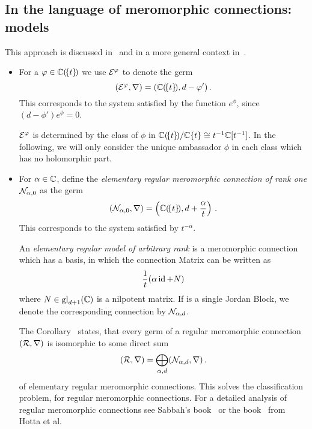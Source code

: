 \subsection{In the language of meromorphic connections: models}
This approach is discussed in~\cite{sabbah_cimpa90} and in a more general
context in~\cite[Sec.II.5]{sabbah2007isomonodromic}.
\begin{defn}\label{defn:elemnMerConnBausteine}
  \begin{itemize}
    \item For a $\varphi\in\mathbb{C}(\!\{t\}\!)$ we use $\mathcal{E}^{\varphi}$ to denote the germ
      \[
        (\mathcal{E}^{\varphi},\nabla)=(\mathbb{C}(\!\{t\}\!),d-\varphi')\,.
      \]
      This corresponds to the system satisfied by the function $e^\phi$, since
      $(d-\phi')e^\phi=0$.
      \begin{s-cor}\label{cor:uniqueAmbassadorForPhi}
        $\mathcal{E}^\varphi$ is determined by the class of $\phi$ in
        $\mathbb{C}(\!\{t\}\!)/\mathbb{C}\{t\}\cong t^{-1}\mathbb{C}[t^{-1}]$. In the following, we
        will only consider the unique ambassador $\phi$ in each class which has
        no holomorphic part.
      \end{s-cor}
    \item For $\alpha\in\mathbb{C}$, define the \emph{elementary regular meromorphic
      connection of rank one} $\mathcal{N}_{\alpha,0}$ as the germ
      \[
        (\mathcal{N}_{\alpha,0},\nabla)=\left(\mathbb{C}(\!\{t\}\!),d+\frac{\alpha}{t}\right)
        \,.
      \]
      This corresponds to the system satisfied by $t^{-\alpha}$.

      An \emph{elementary regular model of arbitrary rank} is a meromorphic
      connection which has a basis, in which the connection Matrix can be
      written as
      \[
        \frac{1}{t} (\alpha\operatorname{id}+N)
      \]
      where $N\in\operatorname{gl}_{d+1}(\mathbb{C})$ is a nilpotent matrix.
      If  is a single Jordan Block, we denote the
      corresponding connection by $\mathcal{N}_{\alpha,d}$.
      \begin{s-rem}
        The Corollary~\cite[Cor.II.2.9]{sabbah2007isomonodromic} states, that
        every germ of a regular meromorphic connection $(\mathcal{R},\nabla)$ is
        isomorphic to some direct sum
        \[
          (\mathcal{R},\nabla)=\bigoplus_{\alpha,d}(\mathcal{N}_{\alpha,d},\nabla)\,.
        \]
        of elementary regular meromorphic connections.
        This solves the classification problem, for regular meromorphic
        connections.
        For a detailed analysis of regular meromorphic connections see Sabbah's
        book~\cite[Sec.II.2]{sabbah2007isomonodromic} or the
        book~\cite[Sec.5.2]{hotta2008} from Hotta et al.
      \end{s-rem}
  \end{itemize}
\end{defn}
